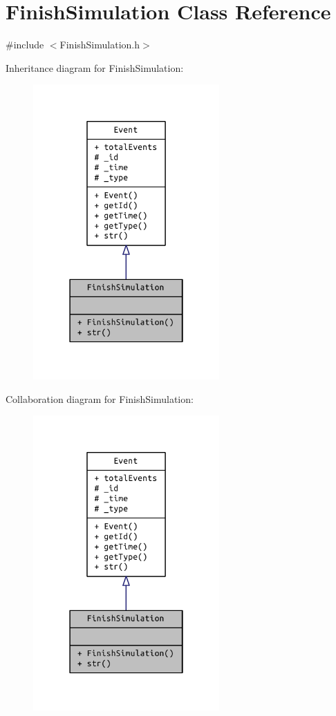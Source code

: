 \hypertarget{class_finish_simulation}{}\section{Finish\+Simulation Class Reference}
\label{class_finish_simulation}


{\ttfamily \#include $<$Finish\+Simulation.\+h$>$}



Inheritance diagram for Finish\+Simulation\+:
\nopagebreak
\begin{figure}[H]
\begin{center}
\leavevmode
\includegraphics[width=202pt]{class_finish_simulation__inherit__graph}
\end{center}
\end{figure}


Collaboration diagram for Finish\+Simulation\+:
\nopagebreak
\begin{figure}[H]
\begin{center}
\leavevmode
\includegraphics[width=202pt]{class_finish_simulation__coll__graph}
\end{center}
\end{figure}
